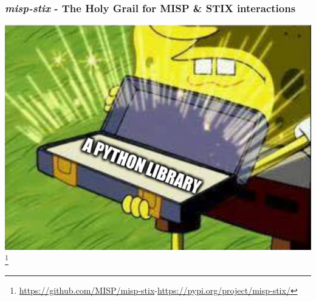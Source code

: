 \begin{frame}
    \frametitle{\emph{misp-stix} - The Holy Grail for MISP \& STIX interactions}
    \centering
    \includegraphics[scale=0.3]{images/solution.png}\footnote{\url{https://github.com/MISP/misp-stix}\hspace{1em}-\hspace{1em}\url{https://pypi.org/project/misp-stix/}}
    \setcounter{footnote}{0}
\end{frame}

